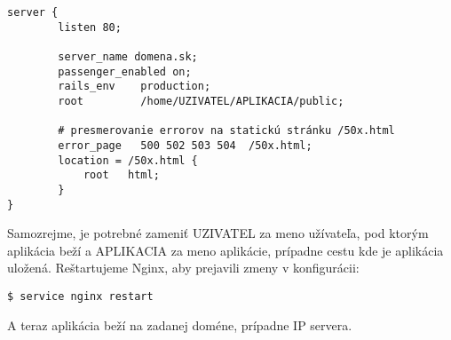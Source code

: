 \begin{verbatim}
server {
        listen 80;

        server_name domena.sk;
        passenger_enabled on;
        rails_env    production;
        root         /home/UZIVATEL/APLIKACIA/public;

        # presmerovanie errorov na statickú stránku /50x.html
        error_page   500 502 503 504  /50x.html;
        location = /50x.html {
            root   html;
        }
}
\end{verbatim}

Samozrejme, je potrebné zameniť UZIVATEL za meno užívateľa, pod ktorým aplikácia beží a APLIKACIA za meno aplikácie, prípadne cestu kde je aplikácia uložená. Reštartujeme Nginx, aby prejavili zmeny v konfigurácii:

\begin{verbatim}
$ service nginx restart
\end{verbatim}

A teraz aplikácia beží na zadanej doméne, prípadne IP servera.